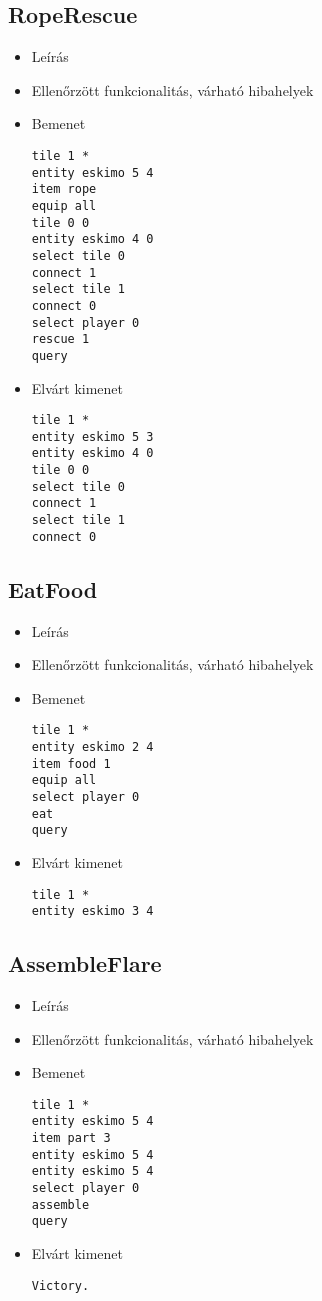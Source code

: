 \subsection{RopeRescue}
\begin{itemize}
\item Leírás\newline
\item Ellenőrzött funkcionalitás, várható hibahelyek
\item Bemenet
\begin{lstlisting}
tile 1 *
entity eskimo 5 4
item rope
equip all
tile 0 0
entity eskimo 4 0
select tile 0
connect 1
select tile 1
connect 0
select player 0
rescue 1
query
\end{lstlisting}
\item Elvárt kimenet
\begin{lstlisting}
tile 1 *
entity eskimo 5 3
entity eskimo 4 0
tile 0 0
select tile 0
connect 1
select tile 1
connect 0
\end{lstlisting}
\end{itemize}

\subsection{EatFood}
\begin{itemize}
\item Leírás\newline
\item Ellenőrzött funkcionalitás, várható hibahelyek
\item Bemenet
\begin{lstlisting}
tile 1 *
entity eskimo 2 4
item food 1
equip all
select player 0
eat
query
\end{lstlisting}
\item Elvárt kimenet
\begin{lstlisting}
tile 1 *
entity eskimo 3 4
\end{lstlisting}
\end{itemize}

\subsection{AssembleFlare}
\begin{itemize}
\item Leírás\newline
\item Ellenőrzött funkcionalitás, várható hibahelyek
\item Bemenet
\begin{lstlisting}
tile 1 *
entity eskimo 5 4
item part 3
entity eskimo 5 4
entity eskimo 5 4
select player 0
assemble
query
\end{lstlisting}
\item Elvárt kimenet
\begin{lstlisting}
Victory.
\end{lstlisting}
\end{itemize}

